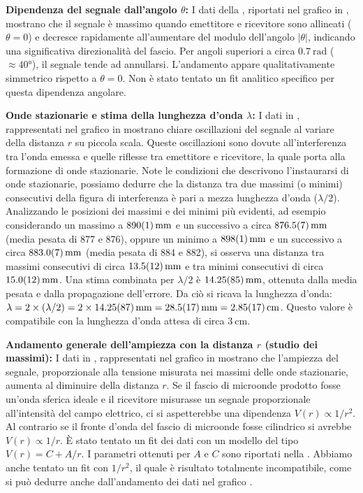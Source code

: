 \documentclass[a4paper]{article}
\begin{document}
\textbf{Dipendenza del segnale dall'angolo $\theta$:}
I dati della , riportati nel grafico in , mostrano che il segnale è massimo quando emettitore e ricevitore sono allineati ($\theta=0$) e decresce rapidamente all'aumentare del modulo dell'angolo $|\theta|$, indicando una significativa direzionalità del fascio. Per angoli superiori a circa $\SI{0.7}{\radian}$ ($\approx \ang{40}$), il segnale tende ad annullarsi. L'andamento appare qualitativamente simmetrico rispetto a $\theta=0$. Non è stato tentato un fit analitico specifico per questa dipendenza angolare.

\textbf{Onde stazionarie e stima della lunghezza d'onda $\lambda$:}
I dati in , rappresentati nel grafico in  mostrano chiare oscillazioni del segnale al variare della distanza $r$ su piccola scala. Queste oscillazioni sono dovute all'interferenza tra l'onda emessa e quelle riflesse tra emettitore e ricevitore, la quale porta alla formazione di onde stazionarie. Note le condizioni che descrivono l'instaurarsi di onde stazionarie, possiamo dedurre che la distanza tra due massimi (o minimi) consecutivi della figura di interferenza è pari a mezza lunghezza d'onda ($\lambda/2$).
Analizzando le posizioni dei massimi e dei minimi più evidenti, ad esempio considerando un massimo a $\SI{890 \pm 1}{\milli\metre}$ e un successivo a circa $\SI{876.5 \pm 0.7}{\milli\metre}$ (media pesata di 877 e 876), oppure un minimo a $\SI{898 \pm 1}{\milli\metre}$ e un successivo a circa $\SI{883 \pm 0.7}{\milli\metre}$ (media pesata di 884 e 882), si osserva una distanza tra massimi consecutivi di circa $\SI{13.5 \pm 1.2}{\milli\metre}$ e tra minimi consecutivi di circa $\SI{15 \pm 1.2}{\milli\metre}$. Una stima combinata per $\lambda/2$ è $\SI{14.25 \pm 0.85}{\milli\metre}$, ottenuta dalla media pesata e dalla propagazione dell'errore.
Da ciò si ricava la lunghezza d'onda:
$\lambda = 2 \times (\lambda/2) = 2 \times \SI{14.25 \pm 0.87}{\milli\metre} = \SI{28.5 \pm 1.7}{\milli\metre} = \SI{2.85 \pm 0.17}{\centi\metre}$.
Questo valore è compatibile con la lunghezza d'onda attesa di circa $\SI{3}{\centi\metre}$.

\textbf{Andamento generale dell'ampiezza con la distanza $r$ (studio dei massimi):}
I dati in , rappresentati nel grafico in  mostrano che l'ampiezza del segnale, proporzionale alla tensione misurata nei massimi delle onde stazionarie, aumenta al diminuire della distanza $r$. Se il fascio di microonde prodotto fosse un'onda sferica ideale e il ricevitore misurasse un segnale proporzionale all'intensità del campo elettrico, ci si aspetterebbe una dipendenza $V(r) \propto 1/r^2$. Al contrario se il fronte d'onda del fascio di microonde fosse cilindrico si avrebbe $V(r) \propto 1/r$.
È stato tentato un fit dei dati con un modello del tipo $V(r) = C + A/r$. I parametri ottenuti per $A$ e $C$ sono riportati nella . Abbiamo anche tentato un fit con $1/r^2$, il quale è risultato totalmente incompatibile, come si può dedurre anche dall'andamento dei dati nel grafico .
\end{document}

